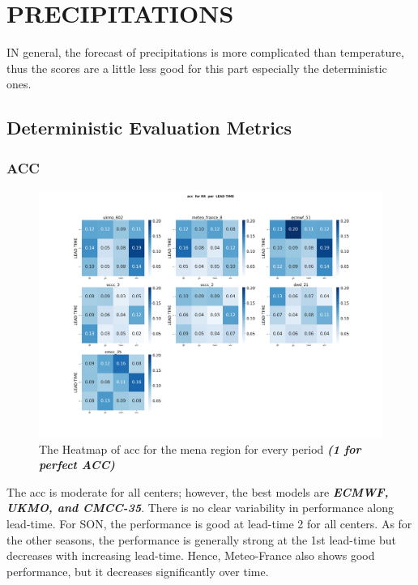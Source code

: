 \section{PRECIPITATIONS}
IN general, the forecast of precipitations is more complicated than temperature, thus the scores are a little less good for this part especially the deterministic ones. 
\subsection{Deterministic Evaluation Metrics}

\subsubsection{ACC}

\begin{figure}[H]
	\centering
	\includegraphics[scale=0.25]{plots/det/acc/acc_RR_mena.png}
	\caption{The Heatmap of acc for the mena region for every period \textbf{\textit{(1 for perfect ACC)} }}
\end{figure}
The acc is moderate for all centers; however, the best models are \textbf{\textit{ECMWF, UKMO, and CMCC-35}}. There is no clear variability in performance along lead-time. For SON, the performance is good at lead-time 2 for all centers. As for the other seasons, the performance is generally strong at the 1st lead-time but decreases with increasing lead-time.
Hence, Meteo-France also shows good performance, but it decreases significantly over time.



